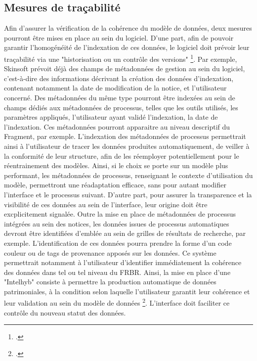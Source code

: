 \subsection{Mesures de traçabilité}
Afin d'assurer la vérification de la cohérence du modèle de données, deux mesures pourront être mises en place au sein du logiciel. 
D'une part, afin de pouvoir garantir l'homogénéité de l'indexation de ces données, le logiciel doit prévoir leur traçabilité via une "historisation ou un contrôle des versions" \footcite{zotero-item-584}. Par exemple, Skinsoft prévoit déjà des champs de métadonnées de gestion au sein du logiciel, c'est-à-dire des informations décrivant la création des données d'indexation, contenant notamment la date de modification de la notice, et l'utilisateur concerné. Des métadonnées du même type pourront être indexées au sein de champs dédiés aux métadonnées de processus, telles que les outils utilisés, les paramètres appliqués, l'utilisateur ayant validé l'indexation, la date de l'indexation. Ces métadonnées pourront apparaitre au niveau descriptif du Fragment, par exemple. 
L'indexation des métadonnées de processus permettrait ainsi à l'utilisateur de tracer les données produites automatiquement, de veiller à la conformité de leur structure, afin de les réemployer potentiellement pour le réentrainement des modèles. Ainsi, si le choix se porte sur un modèle plus performant, les métadonnées de processus, renseignant le contexte d'utilisation du modèle, permettront une réadaptation efficace, sans pour autant modifier l'interface et le processus suivant. 
D'autre part, pour assurer la transparence et la visibilité de ces données au sein de l'interface, leur origine doit être excplicitement signalée. Outre la mise en place de métadonnées de processus intégrées au sein des notices, les données issues de processus automatiques devront être identifiées d'emblée au sein de grilles de résultats de recherche, par exemple. L'identification de ces données pourra prendre la forme d'un code couleur ou de tags de provenance apposés sur les données. Ce système permettrait notamment à l'utilisateur d'identifier immédiatement la cohérence des données dans tel ou tel niveau du \gls{FRBR}.
Ainsi, la mise en place d'une "\gls{Intelhyb}" consiste à permettre la production automatique de données patrimoniales, à la condition selon laquelle l'utilisateur garantit leur cohérence et leur validation au sein du modèle de données \footcite{akata2020}. L'interface doit faciliter ce contrôle du nouveau statut des données. 
